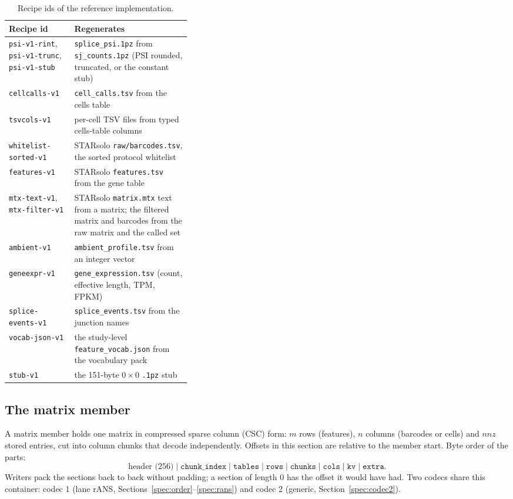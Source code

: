 \begin{table}[htbp]
\centering\footnotesize\setlength{\tabcolsep}{4pt}
\caption{Recipe ids of the reference implementation.}
\label{spec:tab:recipes}
\begin{tabularx}{\linewidth}{@{}>{\raggedright\arraybackslash}p{0.36\linewidth}X@{}}
\toprule
Recipe id & Regenerates \\
\midrule
\texttt{psi-v1-rint}, \texttt{psi-v1-trunc}, \texttt{psi-v1-stub} & \texttt{splice\_psi.1pz} from \texttt{sj\_counts.1pz} (PSI rounded, truncated, or the constant stub) \\
\texttt{cellcalls-v1} & \texttt{cell\_calls.tsv} from the cells table \\
\texttt{tsvcols-v1} & per-cell TSV files from typed cells-table columns \\
\texttt{whitelist-sorted-v1} & STARsolo \texttt{raw/barcodes.tsv}, the sorted protocol whitelist \\
\texttt{features-v1} & STARsolo \texttt{features.tsv} from the gene table \\
\texttt{mtx-text-v1}, \texttt{mtx-filter-v1} & STARsolo \texttt{matrix.mtx} text from a matrix; the filtered matrix and barcodes from the raw matrix and the called set \\
\texttt{ambient-v1} & \texttt{ambient\_profile.tsv} from an integer vector \\
\texttt{geneexpr-v1} & \texttt{gene\_expression.tsv} (count, effective length, TPM, FPKM) \\
\texttt{splice-events-v1} & \texttt{splice\_events.tsv} from the junction names \\
\texttt{vocab-json-v1} & the study-level \texttt{feature\_vocab.json} from the vocabulary pack \\
\texttt{stub-v1} & the 151-byte $0\times 0$ \texttt{.1pz} stub \\
\bottomrule
\end{tabularx}
\end{table}

\subsection{The matrix member}
\label{spec:pz2}
A matrix member holds one matrix in compressed sparse column (CSC) form: $m$ rows (features), $n$ columns
(barcodes or cells) and $\mathit{nnz}$ stored entries, cut into column chunks that decode independently. Offsets in
this section are relative to the member start. Byte order of the parts:
\[
\text{header (256)}\;|\;\texttt{chunk\_index}\;|\;\texttt{tables}\;|\;\texttt{rows}\;|\;\texttt{chunks}\;|\;\texttt{cols}\;|\;\texttt{kv}\;|\;\texttt{extra}.
\]
Writers pack the sections back to back without padding; a section of length 0 has the offset it would have had.
Two codecs share this container: codec 1 (lane rANS, Sections~\ref{spec:order}--\ref{spec:rans}) and codec 2
(generic, Section~\ref{spec:codec2}).

